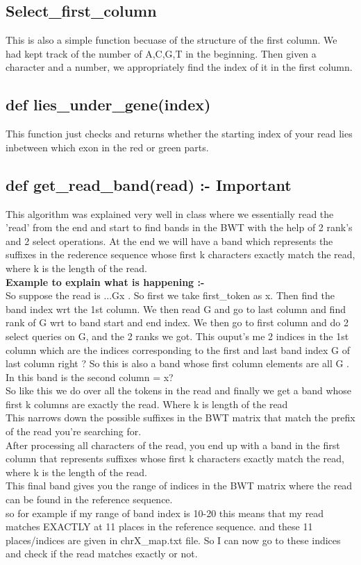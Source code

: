 \documentclass{article}
\begin{document}
\subsection{Select\_first\_column}
This is also a simple function becuase of the structure of the first column. We had kept track of the number of A,C,G,T in the beginning. Then given a character and a number, we appropriately find the index of it in the first column.
\subsection{def lies\_under\_gene(index)}
This function just checks and returns whether the starting index of your read lies inbetween which exon in the red or green parts.
\subsection{def get\_read\_band(read) :- Important}
This algorithm was explained very well in class where we essentially read the 'read' from the end and start to find bands in the BWT with the help of 2 rank's and 2 select operations. At the end we will have a band which represents the suffixes in the rederence sequence whose first k characters exactly match the read, where k is the length of the read.\\
\textbf{Example to explain what is happening :-}\\
So suppose the read is ...Gx . So first we take first\_token as x. Then find the band index wrt the 1st column. We then read G and go to last column and find rank of G wrt to band start and end index. We then go to first column and do 2 select queries on G, and the 2 ranks we got. This ouput's me 2 indices in the 1st column which are the indices corresponding to the first and last band index G of last column right ? So this is also a band whose first column elements are all G . In this band is the second column = x?\\
So like this we do over all the tokens in the read and finally we get a band whose first k columns are exactly the read. Where k is length of the read 
\\
This narrows down the possible suffixes in the BWT matrix that match the prefix of the read you're searching for.\\
After processing all characters of the read, you end up with a band in the first column that represents suffixes whose first k characters exactly match the read, where k is the length of the read.\\
This final band gives you the range of indices in the BWT matrix where the read can be found in the reference sequence.\\
so for example if my range of band index is 10-20 this means that my read matches EXACTLY at 11 places in the reference sequence. 
and these 11 places/indices are given in chrX\_map.txt file. So I can now go to these indices and check if the read matches exactly or not.\\
\end{document}
